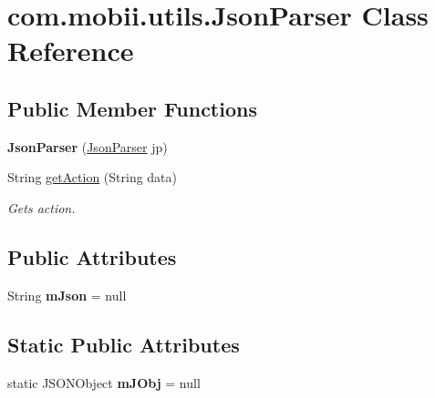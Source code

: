 \hypertarget{classcom_1_1mobii_1_1utils_1_1_json_parser}{\section{com.\-mobii.\-utils.\-Json\-Parser Class Reference}
\label{classcom_1_1mobii_1_1utils_1_1_json_parser}
}
\subsection*{Public Member Functions}
\begin{DoxyCompactItemize}
\item 
\hypertarget{classcom_1_1mobii_1_1utils_1_1_json_parser_af8f30e6ec5cc589937e9e129c78a907e}{{\bfseries Json\-Parser} (\hyperlink{classcom_1_1mobii_1_1utils_1_1_json_parser}{Json\-Parser} jp)}\label{classcom_1_1mobii_1_1utils_1_1_json_parser_af8f30e6ec5cc589937e9e129c78a907e}

\item 
String \hyperlink{classcom_1_1mobii_1_1utils_1_1_json_parser_a244e4b81eb9a8ba5e6fe548729c45286}{get\-Action} (String data)
\begin{DoxyCompactList}\small\item\em Gets action. \end{DoxyCompactList}\end{DoxyCompactItemize}
\subsection*{Public Attributes}
\begin{DoxyCompactItemize}
\item 
\hypertarget{classcom_1_1mobii_1_1utils_1_1_json_parser_ab92ed7b73a27e8d1fa5a408cfc8b32fa}{String {\bfseries m\-Json} = null}\label{classcom_1_1mobii_1_1utils_1_1_json_parser_ab92ed7b73a27e8d1fa5a408cfc8b32fa}

\end{DoxyCompactItemize}
\subsection*{Static Public Attributes}
\begin{DoxyCompactItemize}
\item 
\hypertarget{classcom_1_1mobii_1_1utils_1_1_json_parser_a462b052143a88d30ac5b139375c5d03b}{static J\-S\-O\-N\-Object {\bfseries m\-J\-Obj} = null}\label{classcom_1_1mobii_1_1utils_1_1_json_parser_a462b052143a88d30ac5b139375c5d03b}

\end{DoxyCompactItemize}


